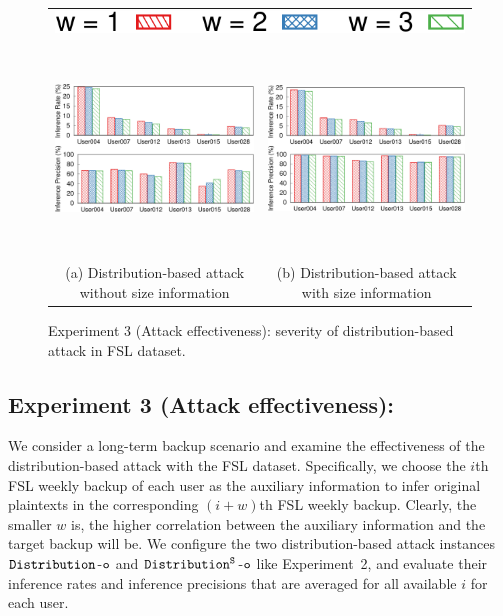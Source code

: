 \begin{figure}[t]
     \centering
    \centering
    \begin{tabular}{c@{\hskip 2em}c}
        \multicolumn{2}{c}{\includegraphics[width=.25\textwidth]{pic/legend-effectiveness.pdf}} \smallskip \\
        \includegraphics[height=2.2in]{pic/distribution-effectiveness-wo-size.pdf} &
	\includegraphics[height=2.2in]{pic/distribution-effectiveness-w-size.pdf} \medskip \\
        {\footnotesize 
        (a) Distribution-based attack without size information  
        } &
        {\footnotesize
        (b) Distribution-based attack with size information 
        } \\
    \end{tabular}
	\caption{Experiment 3 (Attack effectiveness): severity of distribution-based attack in FSL dataset.}
	\label{fig:experiment-distribution-effectiveness}
\end{figure}


\subsection{Experiment 3 (Attack effectiveness):} We consider a long-term
backup scenario and examine the effectiveness of the distribution-based attack
with the FSL dataset. Specifically, we choose the $i$th FSL weekly backup of
each user as the auxiliary information to infer original plaintexts in the corresponding $(i+w)$th FSL
weekly backup. Clearly, the smaller $w$ is, the higher correlation between the
auxiliary information and the target backup will be.  We configure the two  
distribution-based attack instances $\tt Distribution$-$\tt o$ and $\tt Distribution^S$-$\tt o$
like Experiment~2, and evaluate their inference rates and inference precisions that
are averaged for all available $i$ for each user. 

